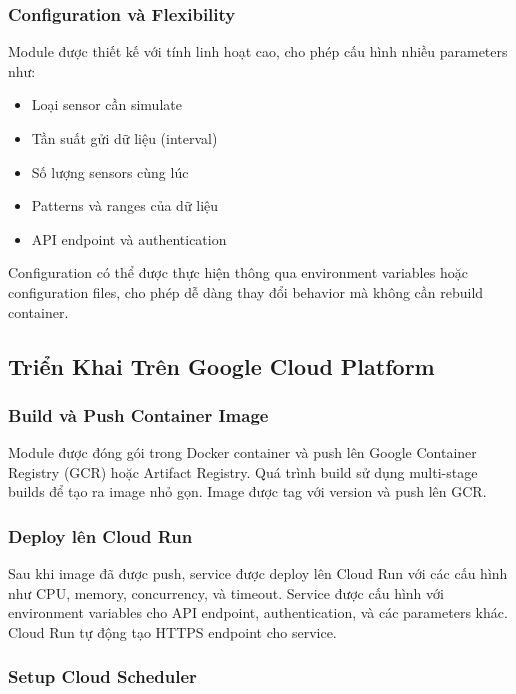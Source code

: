 \subsubsection{Configuration và Flexibility}

Module được thiết kế với tính linh hoạt cao, cho phép cấu hình nhiều parameters như:
\begin{itemize}
    \item Loại sensor cần simulate
    \item Tần suất gửi dữ liệu (interval)
    \item Số lượng sensors cùng lúc
    \item Patterns và ranges của dữ liệu
    \item API endpoint và authentication
\end{itemize}

Configuration có thể được thực hiện thông qua environment variables hoặc configuration files, cho phép dễ dàng thay đổi behavior mà không cần rebuild container.

\subsection{Triển Khai Trên Google Cloud Platform}

\subsubsection{Build và Push Container Image}

Module được đóng gói trong Docker container và push lên Google Container Registry (GCR) hoặc Artifact Registry. Quá trình build sử dụng multi-stage builds để tạo ra image nhỏ gọn. Image được tag với version và push lên GCR.

\subsubsection{Deploy lên Cloud Run}

Sau khi image đã được push, service được deploy lên Cloud Run với các cấu hình như CPU, memory, concurrency, và timeout. Service được cấu hình với environment variables cho API endpoint, authentication, và các parameters khác. Cloud Run tự động tạo HTTPS endpoint cho service.

\subsubsection{Setup Cloud Scheduler}


